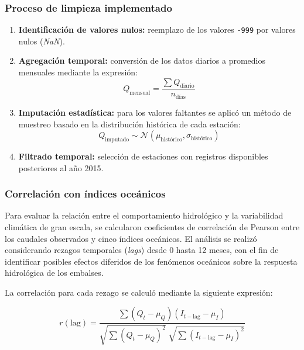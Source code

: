 \subsubsection*{Proceso de limpieza implementado}
\begin{enumerate}
    \item \textbf{Identificación de valores nulos:} reemplazo de los valores \texttt{-999} por valores nulos (\textit{NaN}).
    
    \item \textbf{Agregación temporal:} conversión de los datos diarios a promedios mensuales mediante la expresión:
    \begin{equation}
        Q_{\text{mensual}} = \frac{\sum Q_{\text{diario}}}{n_{\text{días}}}
    \end{equation}
    
    \item \textbf{Imputación estadística:} para los valores faltantes se aplicó un método de muestreo basado en la distribución histórica de cada estación:
    \begin{equation}
        Q_{\text{imputado}} \sim \mathcal{N}(\mu_{\text{histórico}}, \sigma_{\text{histórico}})
    \end{equation}
    
    \item \textbf{Filtrado temporal:} selección de estaciones con registros disponibles posteriores al año 2015.
\end{enumerate}

\subsubsection{Correlación con índices oceánicos}

Para evaluar la relación entre el comportamiento hidrológico y la variabilidad climática de gran escala, se calcularon coeficientes de correlación de Pearson entre los caudales observados y cinco índices oceánicos. El análisis se realizó considerando rezagos temporales (\textit{lags}) desde 0 hasta 12 meses, con el fin de identificar posibles efectos diferidos de los fenómenos oceánicos sobre la respuesta hidrológica de los embalses.

La correlación para cada rezago se calculó mediante la siguiente expresión:

\begin{equation}
r(\text{lag}) =
\frac{\sum \left( Q_t - \mu_Q \right)
\left( I_{t-\text{lag}} - \mu_I \right)}
{\sqrt{\sum \left( Q_t - \mu_Q \right)^2}
\;\sqrt{\sum \left( I_{t-\text{lag}} - \mu_I \right)^2}}
\end{equation}

